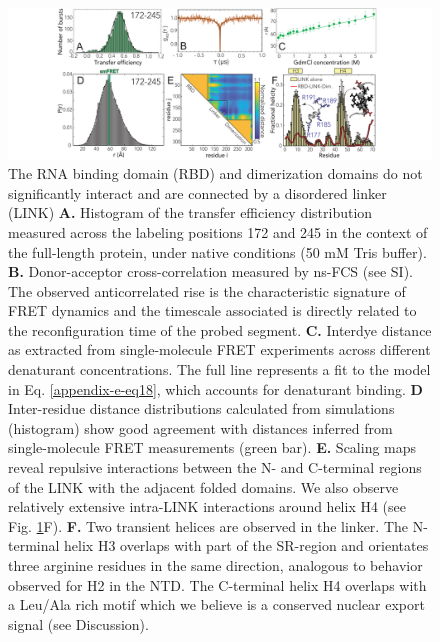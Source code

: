 \documentclass[../main.tex]{subfiles}
\begin{document}
        \begin{figure}[!htb] %
            \centering
            \includegraphics[width=5in]{ch6-fig3.png}
            \caption[The RNA binding domain (RBD) and dimerization domains do not significantly interact and are connected by a disordered linker (LINK).]
                {The RNA binding domain (RBD) and dimerization domains do not significantly interact and are connected by a disordered linker (LINK) \textbf{A.} Histogram of the transfer efficiency distribution measured across the labeling positions 172 and 245 in the context of the full-length protein, under native conditions (50 mM Tris buffer). \textbf{B.} Donor-acceptor cross-correlation measured by ns-FCS (see SI). The observed anticorrelated rise is the characteristic signature of FRET dynamics and the timescale associated is directly related to the reconfiguration time of the probed segment. \textbf{C.} Interdye distance as extracted from single-molecule FRET experiments across different denaturant concentrations. The full line represents a fit to the model in Eq. \ref{appendix-e-eq18}, which accounts for denaturant binding. \textbf{D} Inter-residue distance distributions calculated from simulations (histogram) show good agreement with distances inferred from single-molecule FRET measurements (green bar). \textbf{E.} Scaling maps reveal repulsive interactions between the N- and C-terminal regions of the LINK with the adjacent folded domains. We also observe relatively extensive intra-LINK interactions around helix H4 (see Fig. \ref{fig:ch6-fig3}F). \textbf{F.} Two transient helices are observed in the linker. The N-terminal helix H3 overlaps with part of the SR-region and orientates three arginine residues in the same direction, analogous to behavior observed for H2 in the NTD. The C-terminal helix H4 overlaps with a Leu/Ala rich motif which we believe is a conserved nuclear export signal (see Discussion).}
            \label{fig:ch6-fig3}
        \end{figure}
\end{document}

